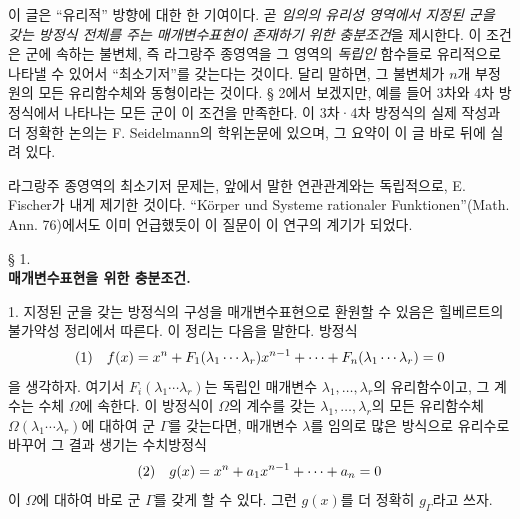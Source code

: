 이 글은 ``유리적'' 방향에 대한 한 기여이다. 곧 \emph{임의의 유리성 영역에서 지정된 군을 갖는 방정식 전체를 주는 매개변수표현이 존재하기 위한 충분조건}을 제시한다. 이 조건은 군에 속하는 불변체, 즉 라그랑주 종영역을 그 영역의 \emph{독립인} 함수들로 유리적으로 나타낼 수 있어서 ``최소기저''를 갖는다는 것이다. 달리 말하면, 그 불변체가 \(n\)개 부정원의 모든 유리함수체와 동형이라는 것이다. § 2에서 보겠지만, 예를 들어 3차와 4차 방정식에서 나타나는 모든 군이 이 조건을 만족한다. 이 3차·4차 방정식의 실제 작성과 더 정확한 논의는 F. Seidelmann의 학위논문에 있으며, 그 요약이 이 글 바로 뒤에 실려 있다.

라그랑주 종영역의 최소기저 문제는, 앞에서 말한 연관관계와는 독립적으로, E. Fischer가 내게 제기한 것이다. ``Körper und Systeme rationaler Funktionen''(Math. Ann. 76)에서도 이미 언급했듯이 이 질문이 이 연구의 계기가 되었다.

\begin{center}
§ 1.\\[0.75em]
\textbf{매개변수표현을 위한 충분조건.}
\end{center}

1. 지정된 군을 갖는 방정식의 구성을 매개변수표현으로 환원할 수 있음은 힐베르트의 불가약성 정리에서 따른다. 이 정리는 다음을 말한다. 방정식
\[
\begin{array}{@{}l@{\quad}l@{}}
(1)& \displaystyle f(x)=x^n+F_1(\lambda_1\cdots\lambda_r)x^{n-1}+\cdots+F_n(\lambda_1\cdots\lambda_r)=0
\end{array}
\]
을 생각하자. 여기서 \(F_i(\lambda_1\cdots\lambda_r)\)는 독립인 매개변수 \(\lambda_1,\ldots,\lambda_r\)의 유리함수이고, 그 계수는 수체 \(\Omega\)에 속한다. 이 방정식이 \(\Omega\)의 계수를 갖는 \(\lambda_1,\ldots,\lambda_r\)의 모든 유리함수체 \(\Omega(\lambda_1\cdots\lambda_r)\)에 대하여 군 \(\Gamma\)를 갖는다면, 매개변수 \(\lambda\)를 임의로 많은 방식으로 유리수로 바꾸어 그 결과 생기는 수치방정식
\[
\begin{array}{@{}l@{\quad}l@{}}
(2)& \displaystyle g(x)=x^n+a_1x^{n-1}+\cdots+a_n=0
\end{array}
\]
이 \(\Omega\)에 대하여 바로 군 \(\Gamma\)를 갖게 할 수 있다. 그런 \(g(x)\)를 더 정확히 \(g_\Gamma\)라고 쓰자.

